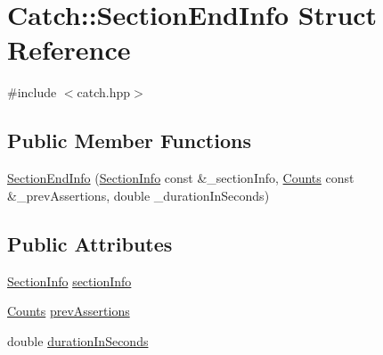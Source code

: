 \hypertarget{structCatch_1_1SectionEndInfo}{\section{Catch\-:\-:Section\-End\-Info Struct Reference}
\label{structCatch_1_1SectionEndInfo}
}


{\ttfamily \#include $<$catch.\-hpp$>$}

\subsection*{Public Member Functions}
\begin{DoxyCompactItemize}
\item 
\hyperlink{structCatch_1_1SectionEndInfo_abc9381c7c22b6907317ec985ccaa6713}{Section\-End\-Info} (\hyperlink{structCatch_1_1SectionInfo}{Section\-Info} const \&\-\_\-section\-Info, \hyperlink{structCatch_1_1Counts}{Counts} const \&\-\_\-prev\-Assertions, double \-\_\-duration\-In\-Seconds)
\end{DoxyCompactItemize}
\subsection*{Public Attributes}
\begin{DoxyCompactItemize}
\item 
\hyperlink{structCatch_1_1SectionInfo}{Section\-Info} \hyperlink{structCatch_1_1SectionEndInfo_a2d44793392cb83735d086d726822abe9}{section\-Info}
\item 
\hyperlink{structCatch_1_1Counts}{Counts} \hyperlink{structCatch_1_1SectionEndInfo_ae70b154cbc05b5dd2901d97f89303d8c}{prev\-Assertions}
\item 
double \hyperlink{structCatch_1_1SectionEndInfo_a7c262f2dab9cff166b8eca620c47eea5}{duration\-In\-Seconds}
\end{DoxyCompactItemize}


